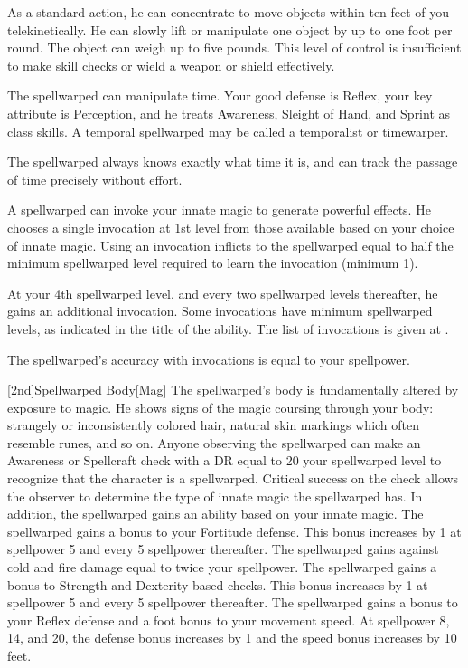         As a standard action, he can concentrate to move objects within ten feet of you telekinetically.
        He can slowly lift or manipulate one object by up to one foot per round.
        The object can weigh up to five pounds.
        This level of control is insufficient to make skill checks or wield a weapon or shield effectively.

        The spellwarped can manipulate time.
        Your good defense is Reflex, your key attribute is Perception, and he treats Awareness, Sleight of Hand, and Sprint as class skills.
        A temporal spellwarped may be called a temporalist or timewarper.

        The spellwarped always knows exactly what time it is, and can track the passage of time precisely without effort.

        A spellwarped can invoke your innate magic to generate powerful effects.
        He chooses a single invocation at 1st level from those available based on your choice of innate magic.
        Using an invocation inflicts  to the spellwarped equal to half the minimum spellwarped level required to learn the invocation (minimum 1).

        At your 4th spellwarped level, and every two spellwarped levels thereafter, he gains an additional invocation.
        Some invocations have minimum spellwarped levels, as indicated in the title of the ability.
        The list of invocations is given at .

        The spellwarped's accuracy with invocations is equal to your spellpower.

        [2nd]{Spellwarped Body}[Mag]
        The spellwarped's body is fundamentally altered by exposure to magic.
        He shows signs of the magic coursing through your body: strangely or inconsistently colored hair, natural skin markings which often resemble runes, and so on.
        Anyone observing the spellwarped can make an Awareness or Spellcraft check with a DR equal to 20 \sub your spellwarped level to recognize that the character is a spellwarped.
        Critical success on the check allows the observer to determine the type of innate magic the spellwarped has.
        In addition, the spellwarped gains an ability based on your innate magic.
        The spellwarped gains a  bonus to your Fortitude defense.
        This bonus increases by 1 at spellpower 5 and every 5 spellpower thereafter.
        The spellwarped gains  against cold and fire damage equal to twice your spellpower.
        The spellwarped gains a  bonus to Strength and Dexterity-based checks.
        This bonus increases by 1 at spellpower 5 and every 5 spellpower thereafter.
        The spellwarped gains a  bonus to your Reflex defense and a  foot bonus to your movement speed.
        At spellpower 8, 14, and 20, the defense bonus increases by 1 and the speed bonus increases by 10 feet.

